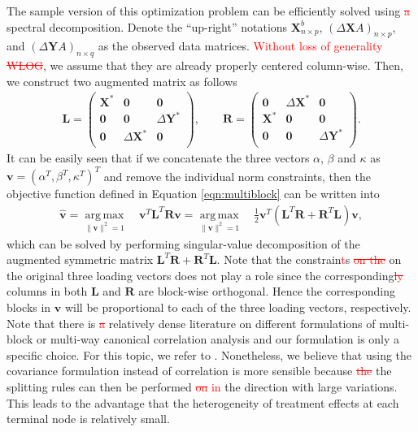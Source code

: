 \documentclass[smallextended]{svjour3}
\DeclareMathOperator*{\argmax}{arg\,max}
\newcommand{\bg}[1]{\textcolor{red}{#1}}
\begin{document}
The sample version of this optimization problem can be efficiently solved using \bg{\st{a}} spectral decomposition. Denote the ``up-right'' notations $\textbf{X}^b_{n \times p}$, $(\Delta \textbf{X}A)_{n \times p}$, and $(\Delta \textbf{Y}A)_{n \times q}$ as the observed data matrices. \bg{Without loss of generality \st{WLOG}}, we assume that they are already properly centered column-wise. Then, we construct two augmented matrix as follows
\begin{align*}
\textbf{L} = \begin{pmatrix}
\textbf{X}^* & \textbf{0} & \textbf{0} \\
\textbf{0} & \textbf{0} &\Delta \textbf{Y}^*\\
\textbf{0} & \Delta \textbf{X}^*& \textbf{0}\\
\end{pmatrix},
\qquad
\textbf{R} = \begin{pmatrix}
\textbf{0} & \Delta \textbf{X}^* & \textbf{0}\\
\textbf{X}^* & \textbf{0} & \textbf{0} \\
\textbf{0} & \textbf{0} &\Delta \textbf{Y}^*\\
\end{pmatrix}.
\end{align*}
It can be easily seen that if we concatenate the three vectors $\alpha$, $\beta$ and $\kappa$ as $\bm{v} = (\alpha^T, \beta^T, \kappa^T)^T$ and remove the individual norm constraints, then the objective function defined in Equation \eqref{eqn:multiblock} can be written into
\begin{align}
\widehat{\bm{v}} = \argmax\limits_{\lVert\bm{v}\rVert^2 = 1} \quad \bm{v}^T \textbf{L}^T \textbf{R} \bm{v}
= \argmax\limits_{\lVert\bm{v}\rVert^2 = 1} \quad \frac{1}{2} \bm{v}^T (\textbf{L}^T \textbf{R} + \textbf{R}^T \textbf{L}) \bm{v},
\end{align}
which can be solved by performing singular-value decomposition of the augmented symmetric matrix $\textbf{L}^T \textbf{R} + \textbf{R}^T \textbf{L}$. Note that the constrain\bg{t}s \bg{\st{on the}} on the original three loading vectors does not play a role since the corresponding\bg{\st{ly}} columns in both $\textbf{L}$ and $\textbf{R}$ are block-wise orthogonal. Hence the corresponding blocks in $\bm{v}$ will be proportional to each of the three loading vectors, respectively. Note that there is \bg{\st{a}} relatively dense literature on different formulations of multi-block or multi-way canonical correlation analysis and our formulation is only a specific choice. For this topic, we refer to \cite{tenenhaus2017regularized}. Nonetheless, we believe that using the covariance formulation instead of correlation is more sensible because \bg{\st{the}} the splitting rules can then be performed \bg{\st{on} in} the direction with large variations. This leads to the advantage that the heterogeneity of treatment effects at each terminal node is relatively small. 
\end{document}
